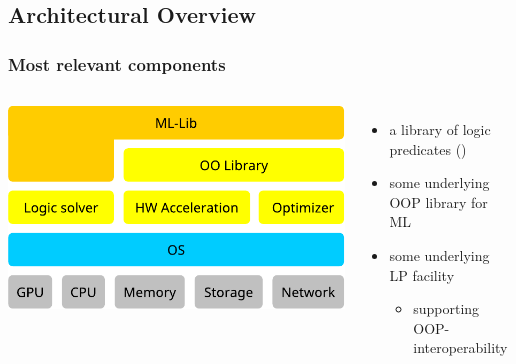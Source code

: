 \documentclass[presentation]{beamer}\mode<presentation>{\usetheme{AMSBolognaFC}}
\begin{document}
\subsection{Architectural Overview}

\begin{frame}%
    \frametitle{Most relevant components}

    \begin{columns}
        \centering
        \includegraphics[width=\linewidth]{figures/layers.pdf}
        \begin{itemize}
            \item a library of logic predicates (\mllib)
            \item some underlying OOP library for ML
            \item some underlying LP facility
            \begin{itemize}
                \item supporting OOP-interoperability
            \end{itemize}
        \end{itemize}
    \end{columns}

\end{frame}
\end{document}
